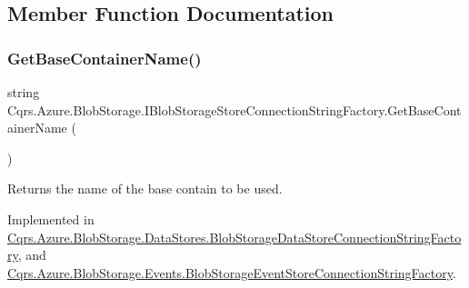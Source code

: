 \subsection{Member Function Documentation}
\mbox{\label{interfaceCqrs_1_1Azure_1_1BlobStorage_1_1IBlobStorageStoreConnectionStringFactory_a57145e68e3bda84bc610fa61226a850c_a57145e68e3bda84bc610fa61226a850c}} 
\subsubsection{\texorpdfstring{Get\+Base\+Container\+Name()}{GetBaseContainerName()}}
{\footnotesize\ttfamily string Cqrs.\+Azure.\+Blob\+Storage.\+I\+Blob\+Storage\+Store\+Connection\+String\+Factory.\+Get\+Base\+Container\+Name (\begin{DoxyParamCaption}{ }\end{DoxyParamCaption})}



Returns the name of the base contain to be used. 



Implemented in \hyperlink{classCqrs_1_1Azure_1_1BlobStorage_1_1DataStores_1_1BlobStorageDataStoreConnectionStringFactory_af9d95c58f5f275d9c9c1575b3d147bdb_af9d95c58f5f275d9c9c1575b3d147bdb}{Cqrs.\+Azure.\+Blob\+Storage.\+Data\+Stores.\+Blob\+Storage\+Data\+Store\+Connection\+String\+Factory}, and \hyperlink{classCqrs_1_1Azure_1_1BlobStorage_1_1Events_1_1BlobStorageEventStoreConnectionStringFactory_a0e6aadced9c9a583884899a4c9de2f1a_a0e6aadced9c9a583884899a4c9de2f1a}{Cqrs.\+Azure.\+Blob\+Storage.\+Events.\+Blob\+Storage\+Event\+Store\+Connection\+String\+Factory}.

